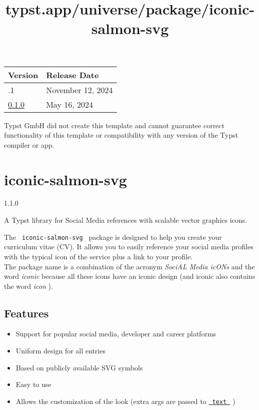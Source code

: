 \begin{longtable}[]{@{}ll@{}}
\toprule\noalign{}
Version & Release Date \\
\midrule\noalign{}
\endhead
\bottomrule\noalign{}
\endlastfoot
0.1.1 & November 12, 2024 \\
\href{https://typst.app/universe/package/bamdone-rebuttal/0.1.0/}{0.1.0}
& May 16, 2024 \\
\end{longtable}

Typst GmbH did not create this template and cannot guarantee correct
functionality of this template or compatibility with any version of the
Typst compiler or app.


\title{typst.app/universe/package/iconic-salmon-svg}

\label{banner}
\section{iconic-salmon-svg}\label{iconic-salmon-svg}

{ 1.1.0 }

A Typst library for Social Media references with scalable vector
graphics icons.

\label{readme}
The \texttt{\ iconic-salmon-svg\ } package is designed to help you
create your curriculum vitae (CV). It allows you to easily reference
your social media profiles with the typical icon of the service plus a
link to your profile.\\
The package name is a combination of the acronym \emph{SociAL Media
icONs} and the word \emph{iconic} because all these icons have an iconic
design (and iconic also contains the word \emph{icon} ).

\subsection{Features}\label{features}

\begin{itemize}
\tightlist
\item
  Support for popular social media, developer and career platforms
\item
  Uniform design for all entries
\item
  Based on publicly available SVG symbols
\item
  Easy to use
\item
  Allows the customization of the look (extra args are passed to
  \href{https://typst.app/docs/reference/text/text/}{\texttt{\ text\ }}
  )
\end{itemize}

